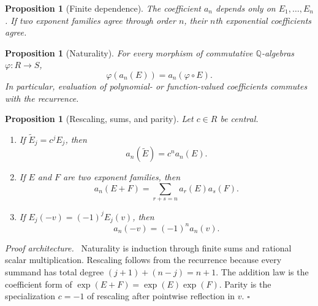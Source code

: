 \documentclass[11pt,oneside]{article}
\newtheorem{proposition}[theorem]{Proposition}
\theoremstyle{definition}
\theoremstyle{remark}
\newcommand{\Q}{\mathbb Q}
\newenvironment{proofidea}{\par\smallskip\noindent\textit{Proof architecture.}\ }{\hfill$\square$\par\smallskip}
\begin{document}
\begin{proposition}[Finite dependence]
\label{integration:prop:expcoeff-finite-dependence}
The coefficient $a_n$ depends only on $E_1,\ldots,E_n$.  If two exponent families agree
through order $n$, their $n$th exponential coefficients agree.
\end{proposition}

\begin{proposition}[Naturality]
\label{integration:prop:expcoeff-naturality}
For every morphism of commutative $\Q$-algebras $\varphi:R\to S$,
\begin{equation}
 \varphi(a_n(E))=a_n(\varphi\circ E).
 \label{integration:eq:expcoeff-map}
\end{equation}
In particular, evaluation of polynomial- or function-valued coefficients commutes with the
recurrence.
\end{proposition}

\begin{proposition}[Rescaling, sums, and parity]
\label{integration:prop:expcoeff-structure}
Let $c\in R$ be central.
\begin{enumerate}
 \item If $\widetilde E_j=c^jE_j$, then
 \begin{equation}
  a_n(\widetilde E)=c^na_n(E).
  \label{integration:eq:expcoeff-rescale}
 \end{equation}
 \item If $E$ and $F$ are two exponent families, then
 \begin{equation}
  a_n(E+F)=\sum_{r+s=n}a_r(E)a_s(F).
  \label{integration:eq:expcoeff-add-convolution}
 \end{equation}
 \item If $E_j(-v)=(-1)^jE_j(v)$, then
 \begin{equation}
  a_n(-v)=(-1)^na_n(v).
  \label{integration:eq:expcoeff-parity}
 \end{equation}
\end{enumerate}
\end{proposition}

\begin{proofidea}
Naturality is induction through finite sums and rational scalar multiplication.
Rescaling follows from the recurrence because every summand has total degree
$(j+1)+(n-j)=n+1$.  The addition law is the coefficient form of
$\exp(E+F)=\exp(E)\exp(F)$.  Parity is the specialization $c=-1$ of rescaling after
pointwise reflection in $v$.
\end{proofidea}
\end{document}
